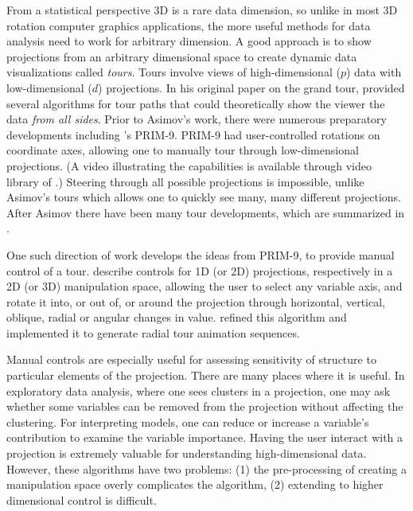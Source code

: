 \documentclass[]{interact}
\theoremstyle{plain}%
\theoremstyle{definition}
\theoremstyle{remark}
\begin{document}
From a statistical perspective 3D is a rare data dimension, so unlike in
most 3D rotation computer graphics applications, the more useful methods
for data analysis need to work for arbitrary dimension. A good approach
is to show projections from an arbitrary dimensional space to create
dynamic data visualizations called \emph{tours}. Tours involve views of
high-dimensional (\(p\)) data with low-dimensional (\(d\)) projections.
In his original paper on the grand tour, \citet{As85} provided several
algorithms for tour paths that could theoretically show the viewer the
data \emph{from all sides}. Prior to Asimov's work, there were numerous
preparatory developments including \citet{tukey}'s PRIM-9. PRIM-9 had
user-controlled rotations on coordinate axes, allowing one to manually
tour through low-dimensional projections. (A video illustrating the
capabilities is available through video library of \citet{ASA22}.)
Steering through all possible projections is impossible, unlike Asimov's
tours which allows one to quickly see many, many different projections.
After Asimov there have been many tour developments, which are
summarized in \citet{lee2021}.

One such direction of work develops the ideas from PRIM-9, to provide
manual control of a tour. \citet{cook_manual_1997} describe controls for
1D (or 2D) projections, respectively in a 2D (or 3D) manipulation space,
allowing the user to select any variable axis, and rotate it into, or
out of, or around the projection through horizontal, vertical, oblique,
radial or angular changes in value. \citet{spyrison_spinifex_2020}
refined this algorithm and implemented it to generate radial tour
animation sequences.

Manual controls are especially useful for assessing sensitivity of
structure to particular elements of the projection. There are many
places where it is useful. In exploratory data analysis, where one sees
clusters in a projection, one may ask whether some variables can be
removed from the projection without affecting the clustering. For
interpreting models, one can reduce or increase a variable's
contribution to examine the variable importance. Having the user
interact with a projection is extremely valuable for understanding
high-dimensional data. However, these algorithms have two problems: (1)
the pre-processing of creating a manipulation space overly complicates
the algorithm, (2) extending to higher dimensional control is difficult.
\end{document}
